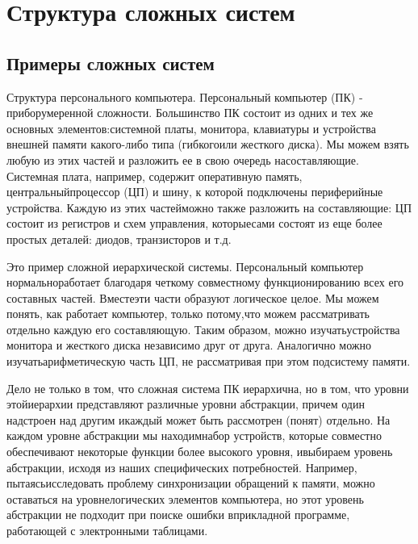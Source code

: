 \documentclass[10pt]{article}
\begin{document}
\section{Структура сложных систем}
\subsection{Примеры сложных систем} 
Структура персонального компьютера. Персональный компьютер (ПК) - прибор\linebreak умеренной сложности. Большинство ПК состоит из одних и тех же основных элементов:\linebreak системной платы, монитора, клавиатуры и устройства внешней памяти какого-либо типа (гибкого\linebreak или жесткого диска). Мы можем взять любую из этих частей и разложить ее в свою очередь на\linebreak составляющие. Системная плата, например, содержит оперативную память, центральный\linebreak процессор (ЦП) и шину, к которой подключены периферийные устройства. Каждую из этих частей\linebreak можно также разложить на составляющие: ЦП состоит из регистров и схем управления, которые\linebreak сами состоят из еще более простых деталей: диодов, транзисторов и т.д. 

Это пример сложной иерархической системы. Персональный компьютер нормально\linebreak работает благодаря четкому совместному функционированию всех его составных частей. Вместе\linebreak эти части образуют логическое целое. Мы можем понять, как работает компьютер, только потому,\linebreak что можем рассматривать отдельно каждую его составляющую. Таким образом, можно изучать\linebreak устройства монитора и жесткого диска независимо друг от друга. Аналогично можно изучать\linebreak арифметическую часть ЦП, не рассматривая при этом подсистему памяти. 

Дело не только в том, что сложная система ПК иерархична, но в том, что уровни этой\linebreak иерархии представляют различные уровни абстракции, причем один надстроен над другим и\linebreak каждый может быть рассмотрен (понят) отдельно. На каждом уровне абстракции мы находим\linebreak набор устройств, которые совместно обеспечивают некоторые функции более высокого уровня, и\linebreak выбираем уровень абстракции, исходя из наших специфических потребностей. Например, пытаясь\linebreak исследовать проблему синхронизации обращений к памяти, можно оставаться на уровне\linebreak логических элементов компьютера, но этот уровень абстракции не подходит при поиске ошибки в\linebreak прикладной программе, работающей с электронными таблицами. 
\end{document}
